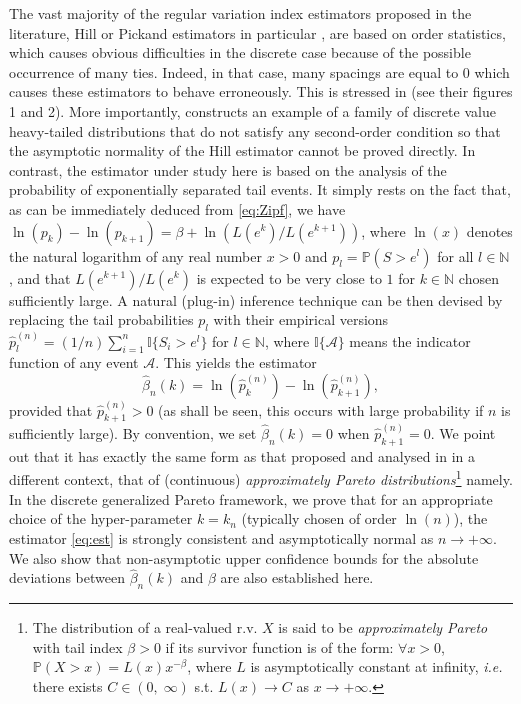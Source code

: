 \documentclass[sn-mathphys-ay]{sn-jnl}%
\begin{document}
The vast majority of the regular variation index estimators proposed in the literature,
Hill or Pickand estimators in particular \citep{Hill1975,Pickands1975}, are based on
order statistics, which causes obvious difficulties in the discrete case because of the
possible occurrence of many ties. Indeed, in that case, many spacings are equal to $0$
which causes these estimators to behave erroneously. This is stressed in \cite{Matsui2013}
(see their figures 1 and 2). More importantly, \cite{Matsui2013} constructs an example of
a family of discrete value heavy-tailed distributions that do not satisfy any
second-order condition so that the asymptotic normality of the Hill estimator cannot be
proved directly. In contrast, the estimator under study here is based on the analysis of
the probability of exponentially separated tail events. It simply rests on the fact that,
as can be immediately deduced from \eqref{eq:Zipf}, we have
$\ln(p_k)-\ln(p_{k+1})=\beta+\ln(L(e^{k})/L(e^{k+1}))$, where $\ln(x)$ denotes the
natural logarithm of any real number $x>0$ and $p_l=\mathbb{P}(S>e^{l})$ for all $l\in
    \mathbb{N}$, and that $L(e^{k + 1})/L(e^k)$ is expected to be very close to $1$ for $k\in
    \mathbb{N}$ chosen sufficiently large. A natural (plug-in) inference technique can be
then devised by replacing the tail probabilities $p_l$ with their empirical versions
$\widehat{p}^{(n)}_l=(1/n)\sum_{i=1}^n \mathbb{I}\{S_i>e^l\}$ for $l\in \mathbb{N}$,
where $\mathbb{I}\{\mathcal{A}\}$ means the indicator function of any event
$\mathcal{A}$. This yields the estimator
\begin{equation}\label{eq:est}
    \widehat{{\beta }}_n\left( k \right) = \ln \left( {\widehat p_k^{(n)}} \right) - \ln \left( \widehat p_{k + 1}^{(n)} \right),
\end{equation}
provided that $\widehat{p}_{k + 1}^{(n)}>0$ (as shall be seen, this occurs with large
probability if $n$ is sufficiently large). By convention, we set $\widehat{{\beta
            }}_n( k )=0$ when $\widehat{p}_{k + 1}^{(n)}=0$. We point out that it has
exactly the same form as that proposed and analysed in \cite{Carpentier2015} in a
different context, that of (continuous) \textit{approximately Pareto
    distributions}\footnote{The distribution of a real-valued r.v. $X$ is said to be
    \textit{approximately Pareto} with tail index $\beta>0$ if its survivor function is of
    the form: $\forall x>0$, $\mathbb{P}(X>x)=L(x)x^{-\beta}$, where $L$ is asymptotically
    constant at infinity, \textit{i.e.} there exists $C\in (0,\; \infty)$ s.t. $L(x)\to C$ as
    $x\rightarrow +\infty$.} namely. In the discrete generalized Pareto framework, we prove
that for an appropriate choice of the hyper-parameter \(k=k_n\) (typically chosen of order
\(\ln(n)\)), the estimator \eqref{eq:est} is strongly consistent and asymptotically
normal as $n\rightarrow +\infty$. We also show that  non-asymptotic upper confidence bounds for the absolute
deviations between $\widehat{{\beta }}_n\left( k \right)$ and $\beta$ are also
established here.
\end{document}
